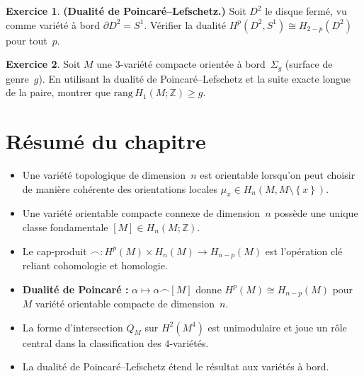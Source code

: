 \documentclass[12pt,a4paper,openany]{book}
\theoremstyle{definition}
\newtheorem{exercice}{Exercice}[chapter]
\theoremstyle{plain}
\theoremstyle{remark}
\newcommand{\Z}{\mathbb{Z}}
\newcommand{\set}[1]{\left\{#1\right\}}
\begin{document}
\begin{exercice}\label{exo:poincare-8}
  \textbf{(Dualité de Poincaré--Lefschetz.)}
  Soit $D^2$ le disque fermé, vu comme variété à bord $\partial D^2 = S^1$.
  Vérifier la dualité $H^p(D^2, S^1) \cong H_{2-p}(D^2)$ pour tout~$p$.
\end{exercice}

\begin{exercice}\label{exo:poincare-9}
  Soit $M$ une $3$-variété compacte orientée à bord~$\Sigma_g$ (surface de genre~$g$).
  En utilisant la dualité de Poincaré--Lefschetz et la suite exacte longue de la
  paire, montrer que $\mathrm{rang}\, H_1(M; \Z) \geq g$.
\end{exercice}

\section*{Résumé du chapitre}

\begin{itemize}
  \item Une variété topologique de dimension~$n$ est orientable lorsqu'on peut choisir
        de manière cohérente des orientations locales $\mu_x \in H_n(M, M \setminus \set{x})$.
  \item Une variété orientable compacte connexe de dimension~$n$ possède une unique
        classe fondamentale $[M] \in H_n(M; \Z)$.
  \item Le cap-produit $\frown \colon H^p(M) \times H_n(M) \to H_{n-p}(M)$ est
        l'opération clé reliant cohomologie et homologie.
  \item \textbf{Dualité de Poincaré :} $\alpha \mapsto \alpha \frown [M]$ donne
        $H^p(M) \cong H_{n-p}(M)$ pour $M$ variété orientable compacte de dimension~$n$.
  \item La forme d'intersection $Q_M$ sur $H^2(M^4)$ est unimodulaire et joue un
        rôle central dans la classification des $4$-variétés.
  \item La dualité de Poincaré--Lefschetz étend le résultat aux variétés à bord.
\end{itemize}



\end{document}
